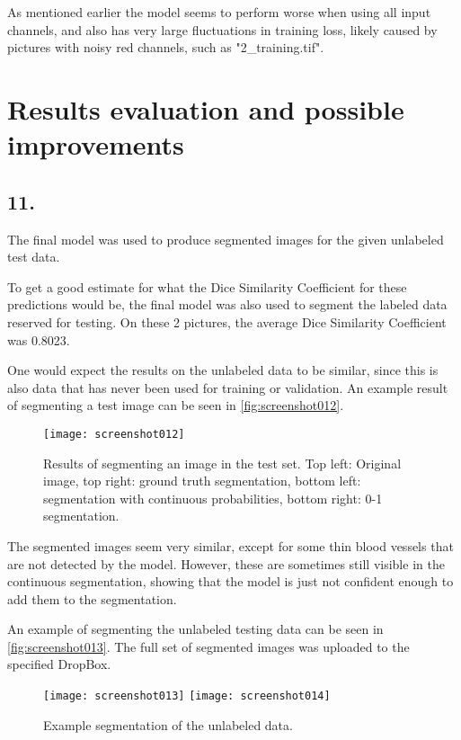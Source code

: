 \documentclass[a4paper, 12pt]{article}
\begin{document}
As mentioned earlier the model seems to perform worse when using all input channels, and also has very large fluctuations in training loss, likely caused by pictures with noisy red channels, such as "2\_training.tif".

\section{Results evaluation and possible improvements}

\subsection{11.}

The final model was used to produce segmented images for the given unlabeled test data. 

To get a good estimate for what the Dice Similarity Coefficient for these predictions would be, the final model was also used to segment the labeled data reserved for testing. On these 2 pictures, the average Dice Similarity Coefficient was 0.8023.

One would expect the results on the unlabeled data to be similar, since this is also data that has never been used for training or validation. An example result of segmenting a test image can be seen in \autoref{fig:screenshot012}.

\begin{figure}[H]
	\centering
	\texttt{[image: screenshot012]}
	\caption{Results of segmenting an image in the test set. Top left: Original image, top right: ground truth segmentation, bottom left: segmentation with continuous probabilities, bottom right: 0-1 segmentation.}
	\label{fig:screenshot012}
\end{figure}

The segmented images seem very similar, except for some thin blood vessels that are not detected by the model. However, these are sometimes still visible in the continuous segmentation, showing that the model is just not confident enough to add them to the segmentation.

An example of segmenting the unlabeled testing data can be seen in \autoref{fig:screenshot013}. The full set of segmented images was uploaded to the specified DropBox.

\begin{figure}[H]
	\centering
	\texttt{[image: screenshot013]}
	\texttt{[image: screenshot014]}
	\caption{Example segmentation of the unlabeled data.}
	\label{fig:screenshot013}
\end{figure}
\end{document}
